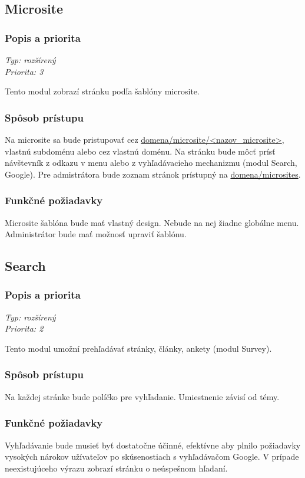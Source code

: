 \documentclass[a4paper,titlepage,11pt]{article}
\begin{document}
\subsection{Microsite}
\subsubsection{Popis a priorita}
\begin{flushleft}
 \emph{Typ: rozšírený}\\
 \emph{Priorita: 3}\\
\end{flushleft}
Tento modul zobrazí stránku podľa šablóny microsite.
\subsubsection{Spôsob prístupu}
Na microsite sa bude pristupovať cez \url{domena/microsite/<nazov_microsite>}, vlastnú subdoménu alebo cez vlastnú doménu.
Na stránku bude môcť prísť návštevník z odkazu v menu alebo z vyhľadávacieho mechanizmu (modul Search, Google). 
Pre admistrátora bude zoznam stránok prístupný na \url{domena/microsites}.
\subsubsection{Funkčné požiadavky}
Microsite šablóna bude mať vlastný design. Nebude na nej žiadne globálne menu. Administrátor bude mať možnosť upraviť šablónu.

\subsection{Search}
\subsubsection{Popis a priorita}
\begin{flushleft}
 \emph{Typ: rozšírený}\\
 \emph{Priorita: 2}\\
\end{flushleft}
Tento modul umožní prehľadávať stránky, články, ankety (modul Survey).
\subsubsection{Spôsob prístupu}
Na každej stránke bude políčko pre vyhľadanie. Umiestnenie závisí od témy.
\subsubsection{Funkčné požiadavky}
Vyhľadávanie bude musieť byť dostatočne účinné, efektívne aby plnilo požiadavky vysokých nárokov užívateľov po skúsenostiach s vyhľadávačom Google. V prípade neexistujúceho výrazu zobrazí stránku o neúspešnom hľadaní.
\end{document}
